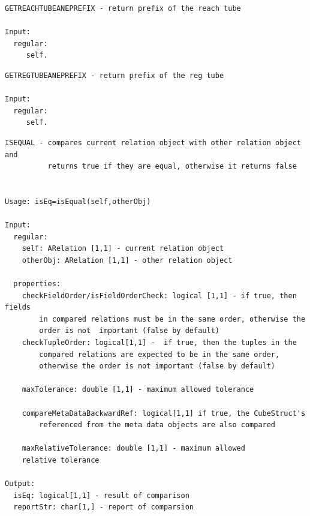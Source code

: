 \documentclass[letterpaper,10pt,english]{sphinxmanual}
\begin{document}
\begin{Verbatim}[commandchars=\\\{\}]
GETREACHTUBEANEPREFIX - return prefix of the reach tube

Input:
  regular:
     self.
\end{Verbatim}

\begin{Verbatim}[commandchars=\\\{\}]
GETREGTUBEANEPREFIX - return prefix of the reg tube

Input:
  regular:
     self.
\end{Verbatim}

\begin{Verbatim}[commandchars=\\\{\}]
ISEQUAL - compares current relation object with other relation object and
          returns true if they are equal, otherwise it returns false


Usage: isEq=isEqual(self,otherObj)

Input:
  regular:
    self: ARelation [1,1] - current relation object
    otherObj: ARelation [1,1] - other relation object

  properties:
    checkFieldOrder/isFieldOrderCheck: logical [1,1] - if true, then fields
        in compared relations must be in the same order, otherwise the
        order is not  important (false by default)
    checkTupleOrder: logical[1,1] -  if true, then the tuples in the
        compared relations are expected to be in the same order,
        otherwise the order is not important (false by default)

    maxTolerance: double [1,1] - maximum allowed tolerance

    compareMetaDataBackwardRef: logical[1,1] if true, the CubeStruct's
        referenced from the meta data objects are also compared

    maxRelativeTolerance: double [1,1] - maximum allowed
    relative tolerance

Output:
  isEq: logical[1,1] - result of comparison
  reportStr: char[1,] - report of comparsion
\end{Verbatim}
\end{document}
